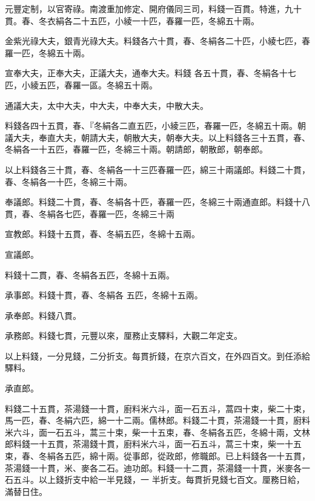 \begin{pinyinscope}
 元豐定制，以官寄祿。南渡重加修定、開府儀同三司，料錢一百貫。特進，九十貫。春、冬衣絹各二十五匹，小綾一十匹，春羅一匹，冬綿五十兩。



 金紫光祿大夫，銀青光祿大夫。料錢各六十貫，春、冬絹各二十匹，小綾七匹，春羅一匹，冬綿五十兩。



 宣奉大夫，正奉大夫，正議大夫，通奉大夫。料錢
 各五十貫，春、冬絹各十七匹，小綾五匹，春羅一區。冬綿五十兩。



 通議大夫，太中大夫，中大夫，中奉大夫，中散大夫。



 料錢各四十五貫，春、『冬絹各二直五匹，小綾三匹，春羅一匹，冬綿五十兩。朝議大夫，奉直大夫，朝請大夫，朝散大夫，朝奉大夫。以上料錢各三十五貫，春、冬絹各一十五匹，春羅一匹，冬綿三十兩。朝請郎，朝散郎，朝奉郎。



 以上料錢各三十貫，春、冬絹各一十三匹春羅一匹，綿三十兩議郎。料錢二十貫，春、冬絹各一十匹，冬綿三十兩。



 奉議郎。料錢二十貫，春、冬絹各十匹，春羅一匹，冬綿三十兩通直郎。料錢十八貫，春、冬絹各七匹，春羅一匹，冬綿三十兩



 宣教郎。料錢十五貫，春、冬絹五匹，冬綿十五兩。



 宣議郎。



 料錢十二貫，春、冬絹各五匹，冬綿十五兩。



 承事郎。料錢十貫，春、冬絹各
 五匹，冬綿十五兩。



 承奉郎。料錢八貫。



 承務郎。料錢七貫，元豐以來，厘務止支驛料，大觀二年定支。



 以上料錢，一分見錢，二分折支。每貫折錢，在京六百文，在外四百文。到任添給驛料。



 承直郎。



 料錢二十五貫，茶湯錢一十貫，廚料米六斗，面一石五斗，蒿四十束，柴二十束，馬一匹，春、冬絹六匹，綿一十二兩。儒林郎。料錢二十貫，茶湯錢一十貫，廚料米六斗，面一石五斗，蒿三十束，柴一十五束，春、冬絹各五匹，冬綿十兩，文林郎料錢一十五貫，茶湯錢十貫，廚料米六斗，面一石五斗，蒿三十束，柴一十五束，春、冬絹各五匹，綿十兩。從事郎，從政郎，修職郎。已上料錢各一十五貫，茶湯錢一十貫，米、麥各二石。迪功郎。料錢一十二貫，茶湯錢一十貫，米麥各一石五斗。以上錢折支中給一半見錢，一
 半折支。每貫折見錢七百文。厘務日給，滿替日住。




\end{pinyinscope}
